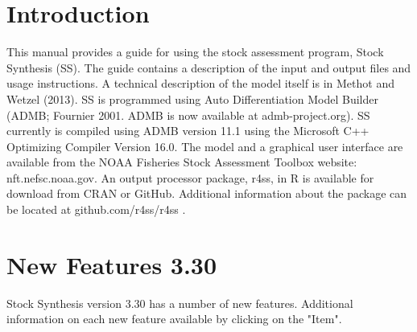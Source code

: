 
 \section{Introduction}\label{sec:intro}
	This manual provides a guide for using the stock assessment program, Stock Synthesis (SS).  The guide contains a description of the input and output files and usage instructions. A technical description of the model itself is in Methot and Wetzel (2013).  SS is programmed using Auto Differentiation Model Builder (ADMB; Fournier 2001.  ADMB is now available at admb-project.org).  SS currently is compiled using ADMB version 11.1 using the Microsoft C++ Optimizing Compiler Version 16.0.  The model and a graphical user interface are available from the NOAA Fisheries Stock Assessment Toolbox website: nft.nefsc.noaa.gov.  An output processor package, r4ss, in R is available for download from CRAN or GitHub.   Additional information about the package can be located at github.com/r4ss/r4ss .
	
\section{New Features 3.30}
		Stock Synthesis version 3.30 has a number of new features. Additional information on each new feature available by clicking on the "Item".
		
